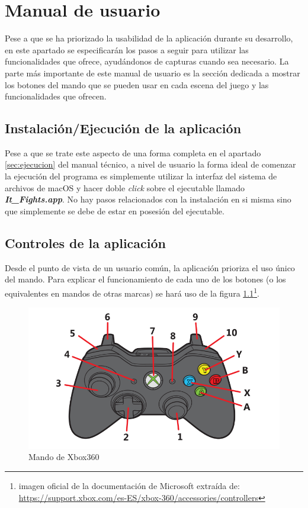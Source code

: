 \chapter{Manual de usuario}

Pese a que se ha priorizado la usabilidad de la aplicación durante su desarrollo, en este apartado se especificarán los pasos a seguir para utilizar las funcionalidades que ofrece, ayudándonos de capturas cuando sea necesario. La parte más importante de este manual de usuario es la sección dedicada a mostrar los botones del mando que se pueden usar en cada escena del juego y las funcionalidades que ofrecen.

\section{Instalación/Ejecución de la aplicación}

Pese a que se trate este aspecto de una forma completa en el apartado \ref{sec:ejecucion} del manual técnico, a nivel de usuario la forma ideal de comenzar la ejecución del programa es simplemente utilizar la interfaz del sistema de archivos de macOS y hacer doble \textit{click} sobre el ejecutable llamado \textbf{\textit{It\_Fights.app}}. No hay pasos relacionados con la instalación en si misma sino que simplemente se debe de estar en posesión del ejecutable.


\section{Controles de la aplicación}
\label{sec:controles}
Desde el punto de vista de un usuario común, la aplicación prioriza el uso único del mando. Para explicar el funcionamiento de cada uno de los botones (o los equivalentes en mandos de otras marcas) se hará uso de la figura \ref{controles:mando}\footnote{imagen oficial de la documentación de Microsoft extraída de: \\ \url{https://support.xbox.com/es-ES/xbox-360/accessories/controllers}}.

\begin{figure}
	\centerline{\includegraphics[width=12cm]{otros/graphicalInterface/mando.png}}
	\caption{Mando de Xbox360}
	\label{controles:mando}
\end{figure}

